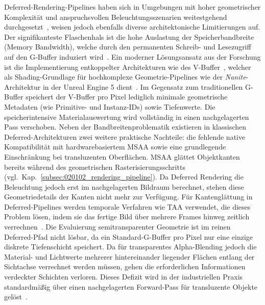 Deferred-Rendering-Pipelines haben sich in Umgebungen mit hoher geometrischer Komplexität und anspruchsvollen
Beleuchtungsszenarien weitestgehend durchgesetzt~\parencite[vgl.][Abschn.~2]{mallettDeferredAdaptiveCompute2018}, weisen jedoch
ebenfalls diverse architektonische Limitierungen auf.
Der signifikanteste Flaschenhals ist die hohe Auslastung der Speicherbandbreite (Memory Bandwidth), welche durch den
permanenten Schreib- und Lesezugriff auf den \ac{G-Buffer} induziert
wird~\parencite[vgl.][S.~55]{burnsVisibilityBufferCacheFriendly2013}.
Ein moderner Lösungsansatz aus der Forschung ist die Implementierung entkoppelter Architekturen wie des
\ac{V-Buffer}~\parencite[vgl.][]{burnsVisibilityBufferCacheFriendly2013}, welcher als Shading-Grundlage für hochkomplexe
Geometrie-Pipelines wie der \textit{Nanite}-Architektur in der Unreal Engine 5
dient~\parencite[vgl.][Folie~\textit{Visibility Buffer}]{Karis_Nanite_SIGGRAPH_Advances_2021_final}.
Im Gegensatz zum traditionellen \ac{G-Buffer} speichert der V-Buffer pro Pixel lediglich minimale geometrische Metadaten
(wie Primitive- und Instanz-IDs) sowie Tiefenwerte.
Die speicherintensive Materialauswertung wird vollständig in einen nachgelagerten Pass verschoben.
Neben der Bandbreitenproblematik existieren in klassischen Deferred-Architekturen zwei weitere praktische Nachteile:
die fehlende native Kompatibilität mit hardwarebasiertem \ac{MSAA} sowie eine grundlegende Einschränkung bei
transluzenten Oberflächen.
\ac{MSAA} glättet Objektkanten bereits während des geometrischen Rasterisierungsschritts
(vgl.\ Kap.~\ref{subsec:020102_rendering_pipeline}).
Da Deferred Rendering die Beleuchtung jedoch erst im nachgelagerten Bildraum berechnet, stehen diese Geometriedetails
der Kanten nicht mehr zur Verfügung.
Für Kantenglättung in Deferred-Pipelines werden temporale Verfahren wie \ac{TAA} verwendet, die dieses Problem lösen,
indem sie das fertige Bild über mehrere Frames hinweg zeitlich
verrechnen~\parencites(vgl.)()[S.~5]{Thaler2011DeferredRendering}[]{taaantialiasing}.
Die Evaluierung semitransparenter Geometrie ist im reinen Deferred-Pfad nicht lösbar, da ein Standard-\ac{G-Buffer}
pro Pixel nur eine einzige diskrete Tiefenschicht speichert.
Da für transparentes Alpha-Blending jedoch die Material- und Lichtwerte mehrerer hintereinander liegender Flächen
entlang der Sichtachse verrechnet werden müssen, gehen die erforderlichen Informationen verdeckter Schichten verloren.
Dieses Defizit wird in der industriellen Praxis standardmäßig über einen nachgelagerten Forward-Pass für
transluzente Objekte gelöst~\parencite[vgl.][S.~56]{burnsVisibilityBufferCacheFriendly2013}.

